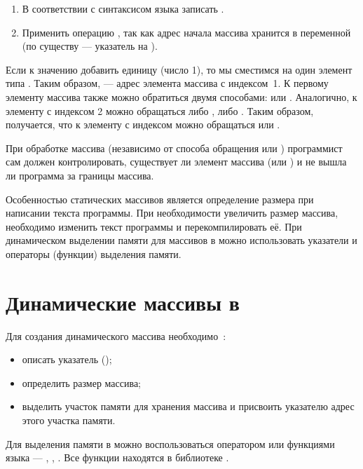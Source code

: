 \begin{enumerate}
\item В соответствии с синтаксисом языка  записать .
\item Применить операцию , так как адрес начала массива хранится в переменной  
(по существу  --- указатель на ).
\end{enumerate}

Если к значению  добавить единицу (число 1), то мы сместимся на один элемент типа .
Таким образом,  --- адрес элемента массива  с индексом~1. К
первому элементу массива  также можно обратиться двумя способами:  или
. Аналогично, к элементу с индексом 2 можно обращаться либо , либо
. Таким образом, получается, что к элементу с индексом  можно обращаться
 или . 

При обработке массива (независимо от способа обращения  или )
программист сам должен контролировать, существует ли элемент массива  (или
) и не вышла ли программа за границы массива.

Особенностью статических массивов является определение размера при написании текста программы. При
необходимости увеличить размер массива, необходимо изменить текст программы и перекомпилировать её. 
При динамическом
выделении памяти для массивов в  можно использовать указатели и операторы (функции) выделения памяти.

\section[Динамические массивы в \Sys{С(С++)}]{Динамические массивы в }
Для создания динамического массива необходимо~\cite{VC++,Shim}:%

\begin{itemize}
\item описать указатель ();
\item определить размер массива;
\item выделить участок памяти для хранения массива и присвоить указателю адрес этого участка памяти.
\end{itemize}
Для выделения памяти в  можно воспользоваться оператором  или функциями языка  ---
, , . Все функции находятся в библиотеке
.

